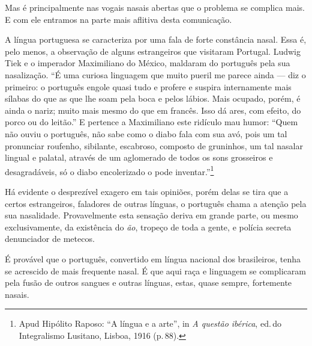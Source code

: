 Mas é principalmente nas vogais nasais abertas que o problema se
complica mais. E com ele entramos na parte mais aflitiva desta
comunicação.

A língua portuguesa se caracteriza por uma fala de forte constância
nasal. Essa é, pelo menos, a observação de alguns estrangeiros que
visitaram Portugal. Ludwig Tiek e o imperador Maximiliano do México,
maldaram do português pela sua nasalização. ``É uma curiosa linguagem
que muito pueril me parece ainda --- diz o primeiro: o português engole
quasi tudo e profere e suspira internamente mais sílabas do que as que
lhe soam pela boca e pelos lábios. Mais ocupado, porém, é ainda o nariz;
muito mais mesmo do que em francês. Isso dá ares, com efeito, do porco
ou do leitão.'' E pertence a Maximiliano este ridículo mau humor: ``Quem
não ouviu o português, não sabe como o diabo fala com sua avó, pois um
tal pronunciar roufenho, sibilante, escabroso, composto de gruninhos, um
tal nasalar lingual e palatal, através de um aglomerado de todos os sons
grosseiros e desagradáveis, só o diabo encolerizado o pode inventar.''\footnote{Apud Hipólito Raposo: ``A língua e a arte'', in \emph{A questão ibérica},
ed.\,do Integralismo Lusitano, Lisboa, 1916 (p.\,88).}

Há evidente o desprezível exagero em tais opiniões, porém delas se tira
que a certos estrangeiros, faladores de outras línguas, o português
chama a atenção pela sua nasalidade. Provavelmente esta sensação deriva
em grande parte, ou mesmo exclusivamente, da existência do \textit{ão}, tropeço
de toda a gente, e polícia secreta denunciador de metecos.

É provável que o português, convertido em língua nacional dos
brasileiros, tenha se acrescido de mais frequente nasal. É que aqui raça
e linguagem se complicaram pela fusão de outros sangues e outras
línguas, estas, quase sempre, fortemente nasais.


